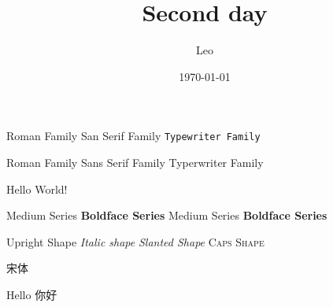 \documentclass{article}[12pt]
\title{Second day}
\author{Leo}
\date{\today}
\begin{document}
\maketitle

\textrm{Roman Family} \textsf{San Serif Family} \texttt{Typewriter Family}


{\rmfamily Roman Family} {\sffamily Sans Serif Family} {\ttfamily Typerwriter Family}

\sffamily Hello World!

\textmd{Medium Series} \textbf{Boldface Series}
{\mdseries Medium Series} {\bfseries Boldface Series}

\textup{Upright Shape} \textit{Italic shape}
\textsl{Slanted Shape} \textsc{Caps Shape}

{\songti 宋体}  

{\tiny Hello}
{你好}
\end{document}
